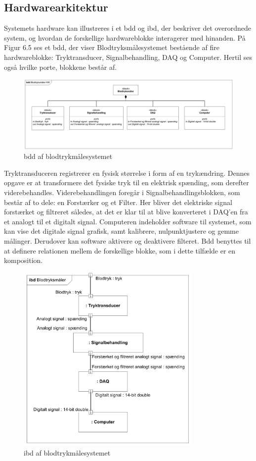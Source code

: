 \subsection{Hardwarearkitektur}
Systemets hardware kan illustreres i et bdd og ibd, der beskriver det overordnede system, og hvordan de forskellige hardwareblokke interagerer med hinanden. På Figur 6.5 ses et bdd, der viser Blodtryksmålesystemet bestående af fire hardwareblokke: Tryktransducer, Signalbehandling, DAQ og Computer. Hertil ses også hvilke porte, blokkene består af.
\begin{figure}[H]
	\centering
	\includegraphics[width=1\textwidth]{Figurer/Snip20151209_70}
	\caption{bdd af blodtrykmålesystemet}
\end{figure}
Tryktransduceren registrerer en fysisk størrelse i form af en trykændring. Dennes opgave er at transformere det fysiske tryk til en elektrisk spænding, som derefter viderebehandles. Viderebehandlingen foregår i Signalbehandlingsblokken, som består af to dele: en Forstærker og et Filter. Her bliver det elektriske signal forstærket og filtreret således, at det er klar til at blive konverteret i DAQ’en fra et analogt til et digitalt signal. Computeren indeholder software til systemet, som kan vise det digitale signal grafisk, samt kalibrere, nulpunktjustere og gemme målinger. Derudover kan software aktivere og deaktivere filteret.  
Bdd benyttes til at definere relationen mellem de forskellige blokke, som i dette tilfælde er en komposition. 
\begin{figure}[H]
	\centering
	\includegraphics[width=0.8\textwidth]{Figurer/Snip20151209_72}
	\caption{ibd af blodtrykmålesystemet}
\end{figure}
